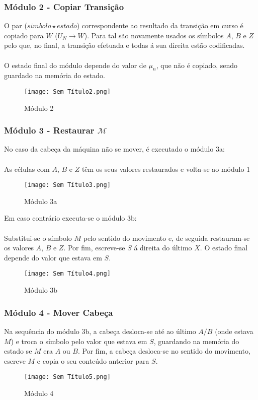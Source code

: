 \documentclass[10pt,a4paper]{report}
\begin{document}
\subsubsection{Módulo 2 - Copiar Transição}
O par ($simbolo \star estado$) correspondente ao resultado da transição em curso é copiado para $W$ ($U_N \rightarrow W$). Para tal são novamente usados os símbolos $A$, $B$ e $Z$ pelo que, no final, a transição efetuada e todas á sua direita estão codificadas.\\
\\
O estado final do módulo depende do valor de $\mu_n$, que não é copiado, sendo guardado na memória do estado.
\begin{figure}[H]
\centering
\texttt{[image: Sem Título2.png]}
\caption{Módulo 2}
\end{figure}
\subsubsection{Módulo 3 - Restaurar $\mathcal{M}$}
No caso da cabeça da máquina não se mover, é executado o módulo 3a:\\
\\
As células com $A$, $B$ e $Z$ têm os seus valores restaurados e volta-se ao módulo 1\\
\begin{figure}[H]
\centering
\texttt{[image: Sem Título3.png]}
\caption{Módulo 3a}
\end{figure}
Em caso contrário executa-se o módulo 3b:\\
\\
Substitui-se o símbolo $M$ pelo sentido do movimento e, de seguida restauram-se os valores $A$, $B$ e $Z$. Por fim, escreve-se $S$ á direita do último $X$. O estado final depende do valor que estava em $S$.
\begin{figure}[H]
\centering
\texttt{[image: Sem Título4.png]}
\caption{Módulo 3b}
\end{figure}
\subsubsection{Módulo 4 - Mover Cabeça}
Na sequência do módulo 3b, a cabeça desloca-se até ao último $A/B$ (onde estava $M$) e troca o símbolo pelo valor que estava em $S$, guardando na memória do estado se $M$ era $A$ ou $B$. Por fim, a cabeça desloca-se no sentido do movimento, escreve $M$ e copia o seu conteúdo anterior para $S$.
\begin{figure}[H]
\centering
\texttt{[image: Sem Título5.png]}
\caption{Módulo 4}
\end{figure}
\end{document}
